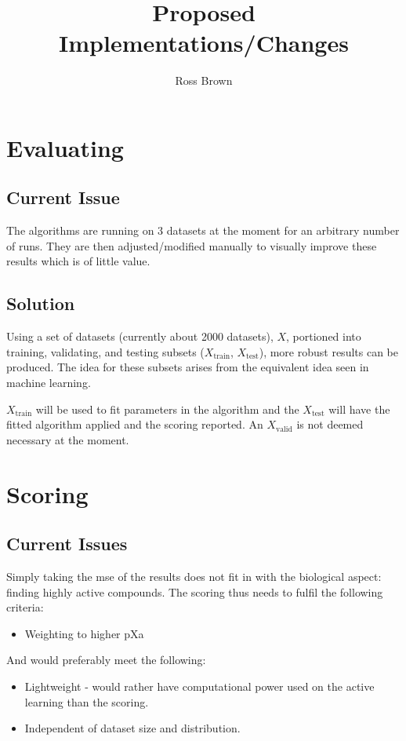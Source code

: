 \documentclass{article}
\begin{document}
\author{Ross Brown}
\title{Proposed Implementations/Changes}
\maketitle
\section{Evaluating}
\subsection{Current Issue}
The algorithms are running on 3 datasets at the moment for an arbitrary number of runs. They are then adjusted/modified manually to visually improve these results which is of little value.
\subsection{Solution}
Using a set of datasets (currently about 2000 datasets), $X$, portioned into training, validating, and testing subsets ($X_\mathrm{train}$, $X_\mathrm{test}$), more robust results can be produced. The idea for these subsets arises from the equivalent idea seen in machine learning.

$X_\mathrm{train}$ will be used to fit parameters in the algorithm and the $X_\mathrm{test}$ will have the fitted algorithm applied and the scoring reported. An $X_\mathrm{valid}$ is not deemed necessary at the moment.
\section{Scoring}
\subsection{Current Issues}
Simply taking the mse of the results does not fit in with the biological aspect: finding highly active compounds. The scoring thus needs to fulfil the following criteria:
\begin{itemize}
    \item Weighting to higher pXa
\end{itemize}
And would preferably meet the following:
\begin{itemize}
    \item Lightweight - would rather have computational power used on the active learning than the scoring.
    \item Independent of dataset size and distribution.
\end{itemize}
\end{document}
